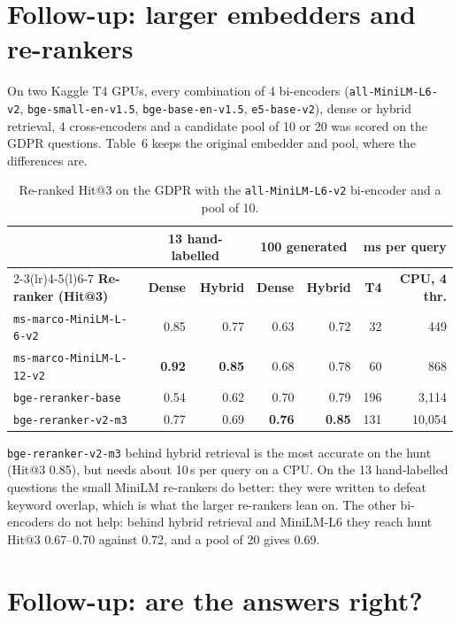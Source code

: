 \documentclass[10pt,a4paper]{article}
\begin{document}
\section{Follow-up: larger embedders and re-rankers}

On two Kaggle T4 GPUs, every combination of 4 bi-encoders (\texttt{all-MiniLM-L6-v2}, \texttt{bge-small-en-v1.5},
\texttt{bge-base-en-v1.5}, \texttt{e5-base-v2}), dense or hybrid retrieval, 4 cross-encoders and a candidate pool
of 10 or 20 was scored on the GDPR questions. Table~6 keeps the original embedder and pool, where the differences
are.

\begin{table}[!htbp]
\centering\small
\begin{tabular}{@{}lrrrrrr@{}}
\toprule
 & \multicolumn{2}{c}{\textbf{13 hand-labelled}} & \multicolumn{2}{c}{\textbf{100 generated}} & \multicolumn{2}{c}{\textbf{ms per query}} \\
\cmidrule(lr){2-3}\cmidrule(lr){4-5}\cmidrule(l){6-7}
\textbf{Re-ranker (Hit@3)} & \textbf{Dense} & \textbf{Hybrid} & \textbf{Dense} & \textbf{Hybrid} & \textbf{T4} & \textbf{CPU, 4 thr.} \\
\midrule
\texttt{ms-marco-MiniLM-L-6-v2}  & 0.85 & 0.77 & 0.63 & 0.72 & 32 & 449 \\
\texttt{ms-marco-MiniLM-L-12-v2} & \textbf{0.92} & \textbf{0.85} & 0.68 & 0.78 & 60 & 868 \\
\texttt{bge-reranker-base}       & 0.54 & 0.62 & 0.70 & 0.79 & 196 & 3{,}114 \\
\texttt{bge-reranker-v2-m3}      & 0.77 & 0.69 & \textbf{0.76} & \textbf{0.85} & 131 & 10{,}054 \\
\bottomrule
\end{tabular}
\caption{Re-ranked Hit@3 on the GDPR with the \texttt{all-MiniLM-L6-v2} bi-encoder and a pool of 10.}
\end{table}

\texttt{bge-reranker-v2-m3} behind hybrid retrieval is the most accurate on the hunt (Hit@3 0.85), but needs about
10\,s per query on a CPU. On the 13 hand-labelled questions the small MiniLM re-rankers do better: they were
written to defeat keyword overlap, which is what the larger re-rankers lean on. The other bi-encoders do not help:
behind hybrid retrieval and MiniLM-L6 they reach hunt Hit@3 0.67--0.70 against 0.72, and a pool of 20 gives 0.69.

\section{Follow-up: are the answers right?}
\end{document}
